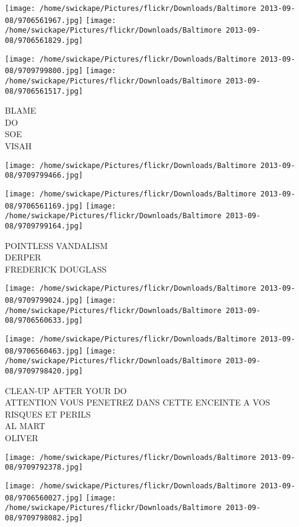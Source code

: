 \documentclass[10pt,letterpaper]{article}
\begin{document}
\texttt{[image: /home/swickape/Pictures/flickr/Downloads/Baltimore 2013-09-08/9706561967.jpg]}
\texttt{[image: /home/swickape/Pictures/flickr/Downloads/Baltimore 2013-09-08/9706561829.jpg]}

\texttt{[image: /home/swickape/Pictures/flickr/Downloads/Baltimore 2013-09-08/9709799800.jpg]}
\texttt{[image: /home/swickape/Pictures/flickr/Downloads/Baltimore 2013-09-08/9706561517.jpg]}

BLAME\\
DO\\
SOE\\
VISAH\\
\pagebreak

\texttt{[image: /home/swickape/Pictures/flickr/Downloads/Baltimore 2013-09-08/9709799466.jpg]}

\vspace{0.25in}
\texttt{[image: /home/swickape/Pictures/flickr/Downloads/Baltimore 2013-09-08/9706561169.jpg]}
\texttt{[image: /home/swickape/Pictures/flickr/Downloads/Baltimore 2013-09-08/9709799164.jpg]}

POINTLESS VANDALISM\\
DERPER\\
FREDERICK DOUGLASS\\
\pagebreak

\texttt{[image: /home/swickape/Pictures/flickr/Downloads/Baltimore 2013-09-08/9709799024.jpg]}
\texttt{[image: /home/swickape/Pictures/flickr/Downloads/Baltimore 2013-09-08/9706560633.jpg]}

\texttt{[image: /home/swickape/Pictures/flickr/Downloads/Baltimore 2013-09-08/9706560463.jpg]}
\texttt{[image: /home/swickape/Pictures/flickr/Downloads/Baltimore 2013-09-08/9709798420.jpg]}

CLEAN{-}UP AFTER YOUR DO\\
ATTENTION VOUS PENETREZ DANS CETTE ENCEINTE A VOS RISQUES ET PERILS\\
AL MART\\
OLIVER\\
\pagebreak

\texttt{[image: /home/swickape/Pictures/flickr/Downloads/Baltimore 2013-09-08/9709792378.jpg]}

\vspace{0.25in}
\texttt{[image: /home/swickape/Pictures/flickr/Downloads/Baltimore 2013-09-08/9706560027.jpg]}
\texttt{[image: /home/swickape/Pictures/flickr/Downloads/Baltimore 2013-09-08/9709798082.jpg]}
\end{document}
